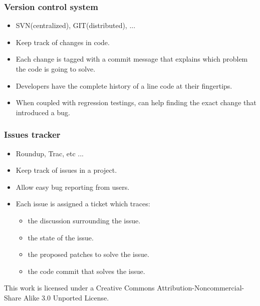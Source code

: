 \documentclass[10pt]{beamer}
\begin{document}
\begin{frame}[fragile]
  \frametitle{Version control system}
  \begin{itemize}
  \item SVN(centralized), GIT(distributed), ...
  \item Keep track of changes in code.
  \item Each change is tagged with a commit message that explains which problem
    the code is going to solve.
  \item Developers have the complete history of a line code at their
    fingertips.
  \item When coupled with regression testings, can help finding the exact change
    that introduced a bug.
  \end{itemize}
\end{frame}

\begin{frame}[fragile]
  \frametitle{Issues tracker}
  \begin{itemize}
    \item Roundup, Trac, etc ...
  \item Keep track of issues in a project.
  \item Allow easy bug reporting from users.
  \item Each issue is assigned a ticket which traces:
    \begin{itemize}
    \item the discussion surrounding the issue.
    \item the state of the issue.
    \item the proposed patches to solve the issue.
    \item the code commit that solves the issue.
    \end{itemize}
  \end{itemize}
\end{frame}
\begin{frame}[fragile]
  \begin{center}
    \tiny
    This work is licensed under a Creative Commons Attribution-Noncommercial-Share Alike 3.0 Unported License.
  \end{center}
\end{frame}
\end{document}

